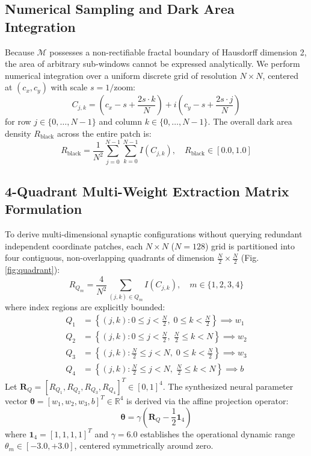\documentclass[10pt,journal,compsoc,twocolumn]{article}
\begin{document}
\subsection{Numerical Sampling and Dark Area Integration}
Because $\mathcal{M}$ possesses a non-rectifiable fractal boundary of Hausdorff dimension 2, the area of arbitrary sub-windows cannot be expressed analytically. We perform numerical integration over a uniform discrete grid of resolution $N \times N$, centered at $(c_x, c_y)$ with scale $s = 1 / \text{zoom}$:
\begin{equation}
C_{j,k} = \left( c_x - s + \frac{2s \cdot k}{N} \right) + i \left( c_y - s + \frac{2s \cdot j}{N} \right)
\end{equation}
for row $j \in \{0, \dots, N-1\}$ and column $k \in \{0, \dots, N-1\}$. The overall dark area density $R_{\text{black}}$ across the entire patch is:
\begin{equation}
R_{\text{black}} = \frac{1}{N^2} \sum_{j=0}^{N-1} \sum_{k=0}^{N-1} I(C_{j,k}), \quad R_{\text{black}} \in [0.0, 1.0]
\end{equation}

\subsection{4-Quadrant Multi-Weight Extraction Matrix Formulation}
To derive multi-dimensional synaptic configurations without querying redundant independent coordinate patches, each $N \times N$ ($N=128$) grid is partitioned into four contiguous, non-overlapping quadrants of dimension $\frac{N}{2} \times \frac{N}{2}$ (Fig. \ref{fig:quadrant}):
\begin{equation}
R_{Q_m} = \frac{4}{N^2} \sum_{(j,k) \in Q_m} I(C_{j,k}), \quad m \in \{1, 2, 3, 4\}
\end{equation}
where index regions are explicitly bounded:
\begin{align}
Q_1 &= \left\{ (j,k) : 0 \le j < \frac{N}{2}, \; 0 \le k < \frac{N}{2} \right\} \implies w_1 \\
Q_2 &= \left\{ (j,k) : 0 \le j < \frac{N}{2}, \; \frac{N}{2} \le k < N \right\} \implies w_2 \\
Q_3 &= \left\{ (j,k) : \frac{N}{2} \le j < N, \; 0 \le k < \frac{N}{2} \right\} \implies w_3 \\
Q_4 &= \left\{ (j,k) : \frac{N}{2} \le j < N, \; \frac{N}{2} \le k < N \right\} \implies b
\end{align}
Let $\mathbf{R}_Q = [R_{Q_1}, R_{Q_2}, R_{Q_3}, R_{Q_4}]^T \in [0,1]^4$. The synthesized neural parameter vector $\boldsymbol{\theta} = [w_1, w_2, w_3, b]^T \in \mathbb{R}^4$ is derived via the affine projection operator:
\begin{equation}
\boldsymbol{\theta} = \gamma \left( \mathbf{R}_Q - \frac{1}{2} \mathbf{1}_4 \right)
\end{equation}
where $\mathbf{1}_4 = [1, 1, 1, 1]^T$ and $\gamma = 6.0$ establishes the operational dynamic range $\theta_m \in [-3.0, +3.0]$, centered symmetrically around zero.
\end{document}
